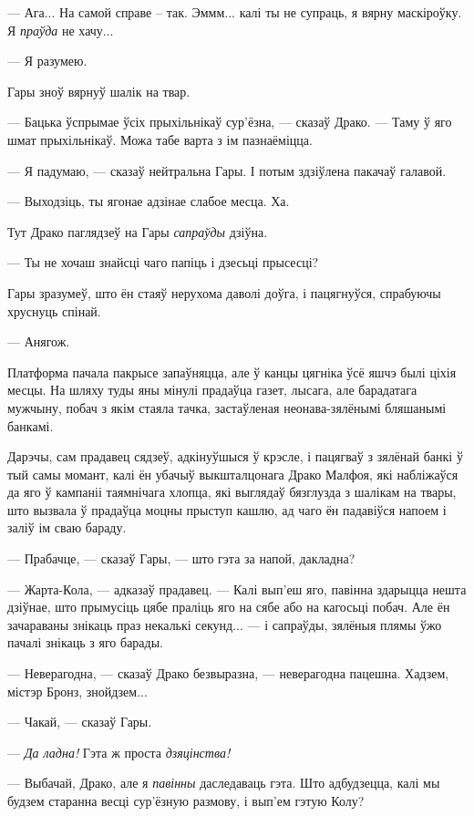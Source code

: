 --- Ага... На самой справе -- так. Эммм... калі ты не супраць, я вярну маскіроўку.
Я \emph{праўда} не хачу... 

--- Я разумею.

Гары зноў вярнуў шалік на твар.

--- Бацька ўспрымае ўсіх прыхільнікаў сур'ёзна, --- сказаў Драко. --- Таму 
ў яго шмат прыхільнікаў. Можа табе варта з ім пазнаёміцца.

--- Я падумаю, --- сказаў нейтральна Гары. І потым здзіўлена пакачаў галавой. 

--- Выходзіць, ты ягонае адзінае слабое месца. Ха.

Тут Драко паглядзеў на Гары \emph{сапраўды} дзіўна.

--- Ты не хочаш знайсці чаго папіць і дзесьці прысесці?

Гары зразумеў, што ён стаяў нерухома даволі доўга, і пацягнуўся, спрабуючы хруснуць 
спінай. 

--- Анягож.

Платформа пачала пакрысе запаўняцца, але ў канцы цягніка ўсё яшчэ былі ціхія месцы.
На шляху туды яны мінулі прадаўца газет, лысага, але барадатага мужчыну, побач з якім
стаяла тачка, застаўленая неонава-зялёнымі бляшанымі банкамі. 

Дарэчы, сам прадавец сядзеў, адкінуўшыся ў крэсле, і пацягваў з зялёнай банкі 
ў тый самы момант, калі ён убачыў выкшталцонага Драко Малфоя, які набліжаўся 
да яго ў кампаніі таямнічага хлопца, які выглядаў бязглузда з шалікам на твары,
што вызвала ў прадаўца моцны прыступ кашлю, ад чаго ён падавіўся напоем і заліў ім
сваю бараду.

--- Прабачце, --- сказаў Гары, --- што гэта за напой, дакладна?

--- Жарта-Кола, --- адказаў прадавец. --- Калі вып'еш яго, павінна здарыцца нешта
дзіўнае, што прымусіць цябе праліць яго на сябе або на кагосьці побач. Але ён зачараваны
знікаць праз некалькі секунд... --- і сапраўды, зялёныя плямы ўжо пачалі знікаць з 
яго барады.

--- Неверагодна, --- сказаў Драко безвыразна, --- неверагодна пацешна. Хадзем, містэр Бронз, 
знойдзем...

--- Чакай, --- сказаў Гары.

--- \emph{Да ладна!} Гэта ж проста \emph{дзяцінства!}

--- Выбачай, Драко, але я \emph{павінны} даследаваць гэта. Што адбудзецца, калі
мы будзем старанна весці сур'ёзную размову, і вып'ем гэтую Колу?

